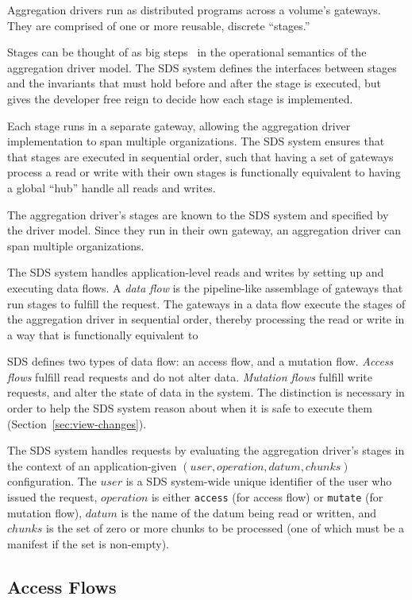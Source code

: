 Aggregation drivers run as distributed programs across a volume's gateways.
They are comprised of one or more reusable, discrete ``stages.''

Stages can be thought of as big steps~\cite{big-step-semantics} in the operational semantics of the
aggregation driver model.  The SDS system defines the interfaces between stages
and the invariants that must hold before and after the stage is executed,
but gives the developer free reign to decide how each stage is implemented.

Each stage runs in a separate gateway, allowing the aggregation driver
implementation to span multiple organizations.  The SDS system ensures that that
stages are executed in sequential order, such that having a set of gateways
process a read or write with their own stages is functionally equivalent to
having a global ``hub'' handle all reads and writes.

The aggregation driver's stages are known to the SDS system and specified by the
driver model.  Since they run in their own gateway, an aggregation driver can
span multiple organizations.

The SDS system handles application-level reads and writes by setting up and
executing data flows.  A \emph{data flow} is the pipeline-like assemblage of gateways
that run stages to fulfill the request.  The gateways in a data flow execute the
stages of the aggregation driver in sequential order, thereby processing the
read or write in a way that is functionally equivalent to 

SDS defines two types of data flow:  an access flow, and a mutation flow.
\emph{Access flows} fulfill read requests and do not alter data.  
\emph{Mutation flows} fulfill write requests, and alter
the state of data in the system.  The distinction is necessary in order to help
the SDS system reason about when it is safe to execute them
(Section~\ref{sec:view-changes}).

The SDS system handles requests by evaluating the aggregation driver's stages in the context of
an application-given $(user, operation, datum, chunks)$ configuration.  The
$user$ is a SDS system-wide unique identifier of the user who issued the request,
$operation$ is either \texttt{access} (for access flow) or \texttt{mutate} (for
mutation flow), $datum$ is the name of the datum being read or written, and
$chunks$ is the set of zero or more chunks to be processed (one of which must be
a manifest if the set is non-empty).

\subsection{Access Flows}

